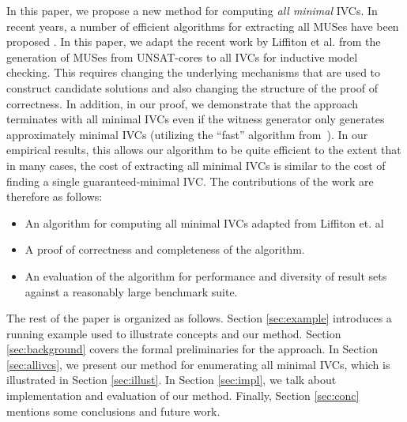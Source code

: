 In this paper, we propose a new method for computing \emph{all minimal} IVCs. In  recent  years,  a  number  of  efficient
algorithms  for  extracting  all MUSes  have  been proposed \cite{Bacchus2016, bacchus2015using, belov2012muser2, belov2013core, belov2012towards, nadel2014accelerated, liffiton2005max}.  In this paper, we adapt the recent work by Liffiton et al. \cite{marco2016fast} from the generation of MUSes from UNSAT-cores to all IVCs for inductive model checking.  This requires changing the underlying mechanisms that are used to construct candidate solutions and also changing the structure of the proof of correctness.  In addition, in our proof, we demonstrate that the approach terminates with all minimal IVCs even if the witness generator only generates approximately minimal IVCs (utilizing the ``fast'' algorithm from~\cite{Ghass16}).  In our empirical results, this allows our algorithm to be quite efficient to the extent that in many cases, the cost of extracting all minimal IVCs is similar to the cost of finding a single guaranteed-minimal IVC.
The contributions of the work are therefore as follows: 
\begin{itemize}
    \item An algorithm for computing all minimal IVCs adapted from Liffiton et. al
    \item A proof of correctness and completeness of the algorithm.  
    \item An evaluation of the algorithm for performance and diversity of result sets against a reasonably large benchmark suite.
\end{itemize}

The rest of the paper is organized as follows.
Section \ref{sec:example} introduces a running example used to illustrate concepts and our method.
Section \ref{sec:background} covers the formal preliminaries for the approach.
In Section \ref{sec:allivcs}, we present our method for enumerating all minimal IVCs,
which is illustrated in
Section \ref{sec:illust}. In Section \ref{sec:impl}, we talk about implementation and evaluation of our method. Finally, Section \ref{sec:conc} mentions some conclusions and future work. 